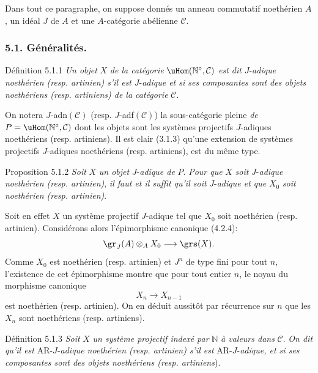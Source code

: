 Dans tout ce paragraphe, on suppose donnés un anneau commutatif noethérien \(A\), un idéal \(J\) de \(A\) et une \(A\)-catégorie abélienne \(\mathcal{C}\).

\subsubsection*{5.1. Généralités.}

\begin{statement}{Définition 5.1.1}
\emph{Un objet} \(X\) \emph{de la catégorie} \(\uHom(\mathbb{N}^\circ,\mathcal{C})\) \emph{est dit} \(J\)-\emph{adique noethérien (resp. artinien) s'il est} \(J\)-\emph{adique et si ses composantes sont des objets noethériens (resp. artiniens) de la catégorie} \(\mathcal{C}\).
\end{statement}

On notera \(J\)-adn\((\mathcal{C})\) (resp. \(J\)-adf\((\mathcal{C})\)) la sous-catégorie pleine \emph{de}
\(P=\uHom(\mathbb{N}^\circ,\mathcal{C})\) dont les objets sont les systèmes projectifs \(J\)-adiques noethériens (resp. artiniens). Il est clair (3.1.3) qu'une extension de systèmes projectifs \(J\)-adiques noethériens (resp. artiniens), est du même type.

\begin{statement}{Proposition 5.1.2}
\emph{Soit} \(X\) \emph{un objet} \(J\)-\emph{adique de} \(P\). \emph{Pour que} \(X\) \emph{soit} \(J\)-\emph{adique noethérien (resp. artinien)}, \emph{il faut et il suffit qu'il soit} \(J\)-\emph{adique et que} \(X_0\) \emph{soit noethérien (resp. artinien)}.
\end{statement}

Soit en effet \(X\) un système projectif \(J\)-adique tel que \(X_0\) soit noethérien (resp. artinien). Considérons alors l'épimorphisme canonique (4.2.4):
\[
\gr_J(A)\otimes_A X_0\longrightarrow \grs(X).
\]
Comme \(X_0\) est noethérien (resp. artinien) et \(J^n\) de type fini pour tout \(n\), l'existence de cet épimorphisme montre que pour tout entier \(n\), le noyau du morphisme canonique
\[
X_n\longrightarrow X_{n-1}
\]
est noethérien (resp. artinien). On en déduit aussitôt par récurrence sur \(n\) que les \(X_n\) sont noethériens (resp. artiniens).

\begin{statement}{Définition 5.1.3}
\emph{Soit} \(X\) \emph{un système projectif indexé par} \(\mathbb{N}\) \emph{à valeurs dans} \(\mathcal{C}\). \emph{On dit qu'il est} AR-\(J\)-\emph{adique noethérien (resp. artinien) s'il est} AR-\(J\)-\emph{adique, et si ses composantes sont des objets noethériens (resp. artiniens}).
\end{statement}

